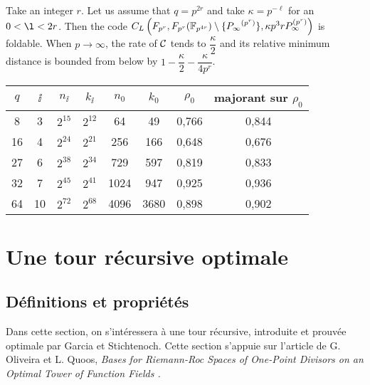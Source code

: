 \documentclass[10pt]{article}
\begin{document}
Take an integer $r$. Let us assume that $q=p^{2r}$ and take $\kappa=p^{-\ell}$ for an $0<\l<2r$. Then the code $C_L\left(F_{p^r},F_{p^r}( \mathbb{F}_{p^{4r}} )\setminus\{ {P_\infty}^{(p^r)} \}, \kappa p^3rP_\infty^{(p^r)}\right)$ is foldable. When $p \rightarrow \infty$, the rate of $\mathcal{C}$ tends to $\dfrac{\kappa}{2}$ and its relative minimum distance is bounded from below by $1-\dfrac{\kappa}{2}-\dfrac{\kappa}{4p^r}$.


\begin{center}
\begin{tabular}{|c|c|c|c|c|c|c|c|}
\hline
$q$ & $\ii$ & $n_{\ii}$ & $k_{\ii}$ & $n_0$ & $k_0$ & $\rho_0$ & majorant sur $\rho_0$ \\ 
\hline
8 & 3 & $2^{15}$ & $2^{12}$ & 64 & 49 & 0,766 & 0,844 \\
\hline
16 & 4 & $2^{24}$ & $2^{21}$ & 256 & 166 & 0,648 & 0,676 \\
\hline
27 & 6 & $2^{38}$ & $2^{34}$ & 729 & 597 & 0,819 & 0,833 \\
\hline
32 & 7 & $2^{45}$ & $2^{41}$ & 1024 & 947 & 0,925 & 0,936 \\
\hline
64 & 10 & $2^{72}$ & $2^{68}$ & 4096 & 3680 & 0,898 & 0,902 \\
\hline
\end{tabular}
\end{center}



\section{Une tour récursive optimale}



\subsection{Définitions et propriétés}



Dans cette section, on s’intéressera à une tour récursive, introduite et prouvée optimale par Garcia et Stichtenoch. Cette section s'appuie sur l'article de G. Oliveira et L. Quoos, \it{Bases for Riemann-Roc Spaces of One-Point Divisors on an Optimal Tower of Function Fields} \rm.






\end{document}
